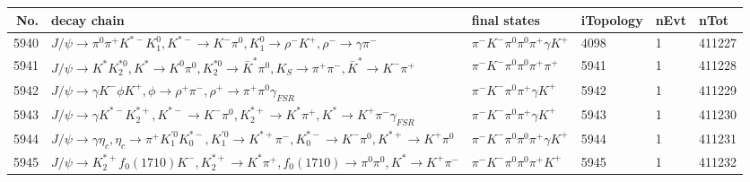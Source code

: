 \begin{table}[htbp] 
\begin{center}
\begin{small}
\begin{tabular}{rlllll}\hline\hline
 No. & decay chain & final states &  iTopology & nEvt & nTot \\\hline
5940&$J/\psi       \rightarrow \pi^{0}        \pi^{+}        K^{*-}         K_1^{0}        , K^{*-}          \rightarrow K^{-}          \pi^{0}        , K_1^{0}         \rightarrow \rho^{-}      K^{+}          , \rho^{-}       \rightarrow \gamma       \pi^{-}        $&$\pi^{-}        K^{-}          \pi^{0}        \pi^{0}        \pi^{+}        \gamma       K^{+}          $& 4098&    1&411227\\
5941&$J/\psi       \rightarrow K^{*}          K_2^{*0}       , K^{*}           \rightarrow K^{0}          \pi^{0}        , K_2^{*0}        \rightarrow \bar{K}^{*}   \pi^{0}        , K_{S}           \rightarrow \pi^{+}        \pi^{-}        , \bar{K}^{*}    \rightarrow K^{-}          \pi^{+}        $&$\pi^{-}        K^{-}          \pi^{0}        \pi^{0}        \pi^{+}        \pi^{+}        $& 5941&    1&411228\\
5942&$J/\psi       \rightarrow \gamma       K^{-}          \phi           K^{+}          , \phi            \rightarrow \rho^{+}      \pi^{-}        , \rho^{+}       \rightarrow \pi^{+}        \pi^{0}        \gamma_{FSR} $&$\pi^{-}        K^{-}          \pi^{0}        \pi^{+}        \gamma       K^{+}          $& 5942&    1&411229\\
5943&$J/\psi       \rightarrow \gamma       K^{*-}         K_2^{*+}       , K^{*-}          \rightarrow K^{-}          \pi^{0}        , K_2^{*+}        \rightarrow K^{*}          \pi^{+}        , K^{*}           \rightarrow K^{+}          \pi^{-}        \gamma_{FSR} $&$\pi^{-}        K^{-}          \pi^{0}        \pi^{+}        \gamma       K^{+}          $& 5943&    1&411230\\
5944&$J/\psi       \rightarrow \gamma       \eta_{c}    , \eta_{c}     \rightarrow \pi^{+}        K_1^{'0}      K_{0}^{*-}     , K_1^{'0}       \rightarrow K^{*+}         \pi^{-}        , K_{0}^{*-}      \rightarrow K^{-}          \pi^{0}        , K^{*+}          \rightarrow K^{+}          \pi^{0}        $&$\pi^{-}        K^{-}          \pi^{0}        \pi^{0}        \pi^{+}        \gamma       K^{+}          $& 5944&    1&411231\\
5945&$J/\psi       \rightarrow K_2^{*+}       f_{0}(1710)    K^{-}          , K_2^{*+}        \rightarrow K^{*}          \pi^{+}        , f_{0}(1710)     \rightarrow \pi^{0}        \pi^{0}        , K^{*}           \rightarrow K^{+}          \pi^{-}        $&$\pi^{-}        K^{-}          \pi^{0}        \pi^{0}        \pi^{+}        K^{+}          $& 5945&    1&411232\\

\end{tabular}
\end{small}
\end{center}
\end{table}
